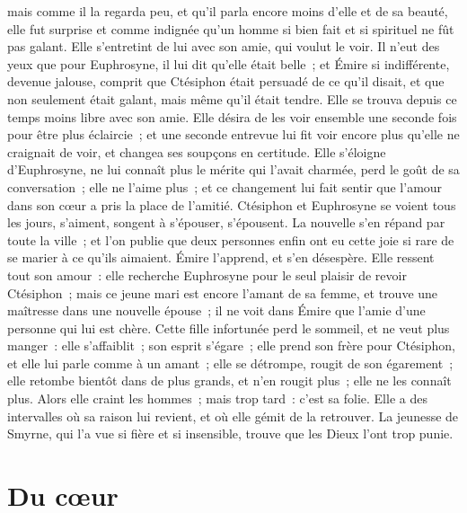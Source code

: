 \documentclass[french,twoside]{book} %
\newcommand\chapteropen{} %
\newcommand\chapterclose{} %
\begin{document}
mais comme il la regarda peu, et qu’il parla encore moins d’elle et de sa beauté, elle fut surprise et comme indignée qu’un homme si bien fait et si spirituel ne fût pas galant. Elle s’entretint de lui avec son amie, qui voulut le voir. Il n’eut des yeux que pour Euphrosyne, il lui dit qu’elle était belle ; et Émire si indifférente, devenue jalouse, comprit que Ctésiphon était persuadé de ce qu’il disait, et que non seulement était galant, mais même qu’il était tendre. Elle se trouva depuis ce temps moins libre avec son amie. Elle désira de les voir ensemble une seconde fois pour être plus éclaircie ; et une seconde entrevue lui fit voir encore plus qu’elle ne craignait de voir, et changea ses soupçons en certitude. Elle s’éloigne d’Euphrosyne, ne lui connaît plus le mérite qui l’avait charmée, perd le goût de sa conversation ; elle ne l’aime plus ; et ce changement lui fait sentir que l’amour dans son cœur a pris la place de l’amitié. Ctésiphon et Euphrosyne se voient tous les jours, s’aiment, songent à s’épouser, s’épousent. La nouvelle s’en répand par toute la ville ; et l’on publie que deux personnes enfin ont eu cette joie si rare de se marier à ce qu’ils aimaient. Émire l’apprend, et s’en désespère. Elle ressent tout son amour : elle recherche Euphrosyne pour le seul plaisir de revoir Ctésiphon ; mais ce jeune mari est encore l’amant de sa femme, et trouve une maîtresse dans une nouvelle épouse ; il ne voit dans Émire que l’amie d’une personne qui lui est chère. Cette fille infortunée perd le sommeil, et ne veut plus manger : elle s’affaiblit ; son esprit s’égare ; elle prend son frère pour Ctésiphon, et elle lui parle comme à un amant ; elle se détrompe, rougit de son égarement ; elle retombe bientôt dans de plus grands, et n’en rougit plus ; elle ne les connaît plus. Alors elle craint les hommes ; mais trop tard : c’est sa folie. Elle a des intervalles où sa raison lui revient, et où elle gémit de la retrouver. La jeunesse de Smyrne, qui l’a vue si fière et si insensible, trouve que les Dieux l’ont trop punie.
\chapterclose


\chapteropen
\chapter[{Du cœur}]{Du cœur}
\label{lb-coeur}\renewcommand{\leftmark}{Du cœur}
\end{document}
